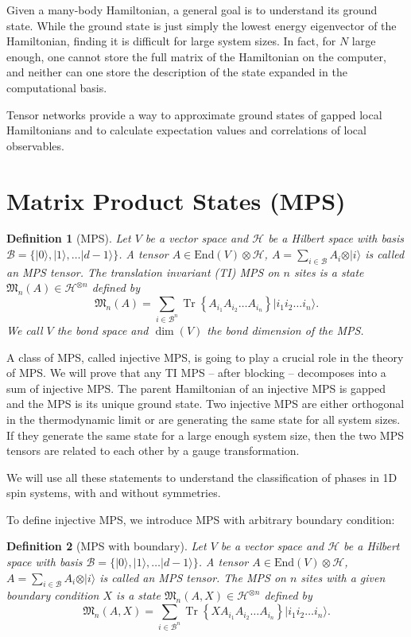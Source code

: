 \documentclass{article}
\newtheorem{definition}{Definition}
\newcommand{\tr}{\operatorname{Tr}}
\newcommand{\End}{\mathrm{End}}
\newcommand{\ket}[1]{\vert #1 \rangle}
\begin{document}
Given a many-body Hamiltonian, a general goal is to understand its ground state. While the ground state is just simply the lowest energy eigenvector of the Hamiltonian, finding it is difficult for large system sizes. In fact, for $N$ large enough, one cannot store the full matrix of the Hamiltonian on the computer, and neither can one store the description of the state expanded in the computational basis. 

Tensor networks provide a way to approximate ground states of gapped local Hamiltonians and to calculate expectation values and correlations of local observables. 
 
\section{Matrix Product States (MPS)}

\begin{definition}[MPS]
  Let $V$ be a vector space and $\mathcal{H}$ be a Hilbert space with basis $\mathcal{B} = \{\ket{0},\ket{1},\dots \ket{d-1}\}$. A tensor $A\in \End(V)\otimes \mathcal{H}$, $A = \sum_{i\in \mathcal{B}} A_i \otimes \ket{i}$ is called an MPS tensor. The translation invariant (TI) MPS on $n$ sites is a state $\mathfrak{M}_n(A)\in \mathcal{H}^{\otimes n}$ defined by
  \begin{equation*}
  	\mathfrak{M}_n(A) = \sum_{i\in \mathcal{B}^n} \tr\left\{A_{i_1} A_{i_2} \dots A_{i_n}\right\} \ket{i_1 i_2 \dots i_n}.
  \end{equation*}
  We call $V$ the bond space and $\dim(V)$ the bond dimension of the MPS.
\end{definition}

A class of MPS, called injective MPS, is going to play a crucial role in the theory of MPS. We will prove that any TI MPS -- after blocking -- decomposes into a sum of injective MPS. The parent Hamiltonian of an injective MPS is gapped and the MPS is its unique ground state. Two injective MPS are either orthogonal in the thermodynamic limit or are generating the same state for all system sizes. If they generate the same state for a large enough system size, then the two MPS tensors are related to each other by a gauge transformation. 

We will use all these statements to understand the classification of phases in 1D spin systems, with and without symmetries. 

To define injective MPS, we introduce MPS with arbitrary boundary condition:
\begin{definition}[MPS with boundary]
  Let $V$ be a vector space and $\mathcal{H}$ be a Hilbert space with basis $\mathcal{B} = \{\ket{0},\ket{1},\dots \ket{d-1}\}$. A tensor $A\in \End(V)\otimes \mathcal{H}$, $A = \sum_{i\in \mathcal{B}} A_i \otimes \ket{i}$ is called an MPS tensor. The MPS on $n$ sites with a given boundary condition $X$ is a state $\mathfrak{M}_n(A,X)\in \mathcal{H}^{\otimes n}$ defined by
  \begin{equation*}
    \mathfrak{M}_n(A,X) = \sum_{i\in \mathcal{B}^n} \tr\left\{XA_{i_1} A_{i_2} \dots A_{i_n}\right\} \ket{i_1 i_2 \dots i_n}.
  \end{equation*}
\end{definition}
\end{document}
